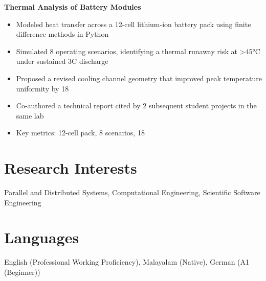 \documentclass[11pt,a4paper]{article}
\begin{document}
\textbf{ Thermal Analysis of Battery Modules }
\begin{itemize}[leftmargin=*,nosep,topsep=2pt]
    
    \item Modeled heat transfer across a 12-cell lithium-ion battery pack using finite difference methods in Python
    
    \item Simulated 8 operating scenarios, identifying a thermal runaway risk at >45°C under sustained 3C discharge
    
    \item Proposed a revised cooling channel geometry that improved peak temperature uniformity by 18%
    
    \item Co-authored a technical report cited by 2 subsequent student projects in the same lab
    
    \item Key metrics: 12-cell pack, 8 scenarios, 18%
    
\end{itemize}


\section{Research Interests}
Parallel and Distributed Systems, Computational Engineering, Scientific Software Engineering

\section{Languages}
English (Professional Working Proficiency), Malayalam (Native), German (A1 (Beginner))
\end{document}
